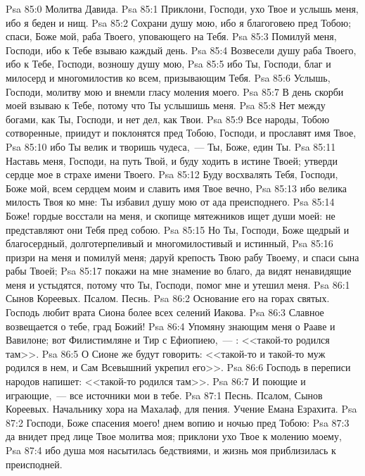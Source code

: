 \vs Psa 85:0 Молитва Давида.
\rsbpar\vs Psa 85:1 Приклони, Господи, ухо Твое и услышь меня, ибо я беден и нищ.
\vs Psa 85:2 Сохрани душу мою, ибо я благоговею пред Тобою; спаси, Боже мой, раба Твоего, уповающего на Тебя.
\vs Psa 85:3 Помилуй меня, Господи, ибо к Тебе взываю каждый день.
\vs Psa 85:4 Возвесели душу раба Твоего, ибо к Тебе, Господи, возношу душу мою,
\vs Psa 85:5 ибо Ты, Господи, благ и милосерд и многомилостив ко всем, призывающим Тебя.
\vs Psa 85:6 Услышь, Господи, молитву мою и внемли гласу моления моего.
\vs Psa 85:7 В день скорби моей взываю к Тебе, потому что Ты услышишь меня.
\vs Psa 85:8 Нет между богами, как Ты, Господи, и нет дел, как Твои.
\vs Psa 85:9 Все народы, Тобою сотворенные, приидут и поклонятся пред Тобою, Господи, и прославят имя Твое,
\vs Psa 85:10 ибо Ты велик и творишь чудеса,~--- Ты, Боже, един Ты.
\vs Psa 85:11 Наставь меня, Господи, на путь Твой, и буду ходить в истине Твоей; утверди сердце мое в страхе имени Твоего.
\vs Psa 85:12 Буду восхвалять Тебя, Господи, Боже мой, всем сердцем моим и славить имя Твое вечно,
\vs Psa 85:13 ибо велика милость Твоя ко мне: Ты избавил душу мою от ада преисподнего.
\vs Psa 85:14 Боже! гордые восстали на меня, и скопище мятежников ищет души моей: не представляют они Тебя пред собою.
\vs Psa 85:15 Но Ты, Господи, Боже щедрый и благосердный, долготерпеливый и многомилостивый и истинный,
\vs Psa 85:16 призри на меня и помилуй меня; даруй крепость Твою рабу Твоему, и спаси сына рабы Твоей;
\vs Psa 85:17 покажи на мне знамение во благо, да видят ненавидящие меня и устыдятся, потому что Ты, Господи, помог мне и утешил меня.
\vs Psa 86:1 Сынов Кореевых. Псалом. Песнь.
\rsbpar\vs Psa 86:2 Основание его на горах святых. Господь любит врата Сиона более всех селений Иакова.
\vs Psa 86:3 Славное возвещается о тебе, град Божий!
\vs Psa 86:4 Упомяну знающим меня о Рааве и Вавилоне; вот Филистимляне и Тир с Ефиопиею,~--- : <<такой-то родился там>>.
\vs Psa 86:5 О Сионе же будут говорить: <<такой-то и такой-то муж родился в нем, и Сам Всевышний укрепил его>>.
\vs Psa 86:6 Господь в переписи народов напишет: <<такой-то родился там>>.
\vs Psa 86:7 И поющие и играющие,~--- все источники мои в тебе.
\vs Psa 87:1 Песнь. Псалом, Сынов Кореевых. Начальнику хора на Махалаф, для пения. Учение Емана Езрахита.
\rsbpar\vs Psa 87:2 Господи, Боже спасения моего! днем вопию и ночью пред Тобою:
\vs Psa 87:3 да внидет пред лице Твое молитва моя; приклони ухо Твое к молению моему,
\vs Psa 87:4 ибо душа моя насытилась бедствиями, и жизнь моя приблизилась к преисподней.
